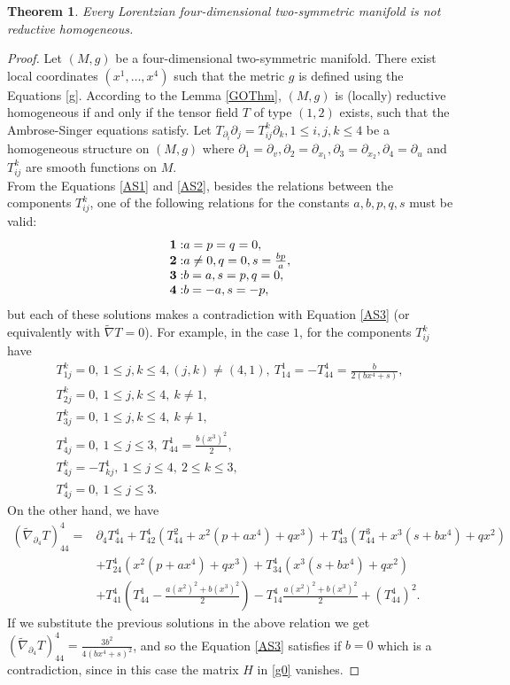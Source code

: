 \documentclass[11pt,oneside,leqno]{amsart}
\theoremstyle{plain}
\newtheorem{theorem}{Theorem}[section]
\begin{document}
\begin{theorem}\label{thm1}
Every Lorentzian four-dimensional two-symmetric manifold is not reductive homogeneous.
\end{theorem}
\begin{proof}
Let $(M,g)$ be a four-dimensional two-symmetric manifold. There exist local coordinates $(x^1,\dots,x^4)$ such that the metric $g$ is defined using the Equations \eqref{g}. According to the Lemma \ref{GOThm}, $(M,g)$ is (locally) reductive homogeneous if and only if the tensor field $T$ of type $(1,2)$ exists, such that the Ambrose-Singer equations satisfy.
Let $T_{\partial_i}\partial_j= T^k_{ij }\partial_k, 1\leq i,j,k\leq 4$ be a homogeneous structure on $(M, g)$ where $\partial_1=\partial_v, \partial_2=\partial_{x_1},\partial_3=\partial_{x_2},\partial_4=\partial_u$ and
$T^k_{ij}$ are smooth functions on $M$.\\
From the Equations \eqref{AS1} and \eqref{AS2}, besides the relations between the components $T^k_{ij}$, one of the following relations for the constants $a,b,p,q,s$ must be valid:
$$
\begin{array}{l}
{\bf 1:} a=p=q=0,\\
{\bf 2:} a\neq0,q=0,s=\frac{bp}{a},\\
{\bf 3:} b=a,s=p,q=0,\\
{\bf 4:} b=-a,s=-p,
\end{array}
$$
but each of these solutions makes a contradiction with Equation \eqref{AS3} (or equivalently with $\widetilde\nabla T=0$). For example, in the case {\bf $1$}, for the components $T^k_{ij}$ have
$$
\begin{array}{l}
T_{1j}^k=0,\ 1\leq j,k\leq 4,(j,k)\neq(4,1),\ T_{14}^1=-T_{44}^4=\frac{b}{2(bx^4+s)},\\
T_{2j}^k=0,\ 1\leq j,k\leq 4,\ k\neq 1,\\
T_{3j}^k=0,\ 1\leq j,k\leq 4,\ k\neq 1,\\
T_{4j}^1=0,\ 1\leq j\leq 3,\ T_{44}^1=\frac{b(x^3)^2}{2},\\
T_{4j}^k=-T_{kj}^1,\ 1\leq j\leq 4,\ 2\leq k\leq 3,\\
T_{4j}^4=0,\ 1\leq j\leq 3.
\end{array}
$$
On the other hand, we have
$$
\begin{array}{ll}
(\widetilde\nabla_{\partial_4}T)_{44}^4=&\partial_4T_{44}^4+T_{42}^4(T_{44}^2+x^2(p+ax^4)+qx^3)+T_{43}^4(T_{44}^3+x^3(s+bx^4)+qx^2)\\
&+T_{24}^4(x^2(p+ax^4)+qx^3)+T_{34}^4(x^3(s+bx^4)+qx^2)\\
&+T_{41}^4(T_{44}^1-\frac{a(x^2)^2+b(x^3)^2}{2})-T_{14}^4\frac{a(x^2)^2+b(x^3)^2}{2}+(T_{44}^4)^2.
\end{array}
$$
If we  substitute the previous solutions in the above relation we get $(\widetilde\nabla_{\partial_4}T)_{44}^4=\frac{3b^2}{4(bx^4+s)^2}$, and so the Equation \eqref{AS3} satisfies if $b=0$ which is a contradiction, since in this case the matrix $H$ in \eqref{g0} vanishes.
\end{proof}
\end{document}
